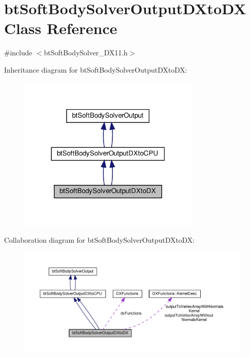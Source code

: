 \hypertarget{classbtSoftBodySolverOutputDXtoDX}{}\section{bt\+Soft\+Body\+Solver\+Output\+D\+Xto\+DX Class Reference}
\label{classbtSoftBodySolverOutputDXtoDX}


{\ttfamily \#include $<$bt\+Soft\+Body\+Solver\+\_\+\+D\+X11.\+h$>$}



Inheritance diagram for bt\+Soft\+Body\+Solver\+Output\+D\+Xto\+DX\+:
\nopagebreak
\begin{figure}[H]
\begin{center}
\leavevmode
\includegraphics[width=247pt]{classbtSoftBodySolverOutputDXtoDX__inherit__graph}
\end{center}
\end{figure}


Collaboration diagram for bt\+Soft\+Body\+Solver\+Output\+D\+Xto\+DX\+:
\nopagebreak
\begin{figure}[H]
\begin{center}
\leavevmode
\includegraphics[width=350pt]{classbtSoftBodySolverOutputDXtoDX__coll__graph}
\end{center}
\end{figure}
